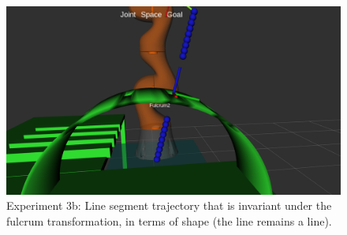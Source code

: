 \begin{center}
\begin{figure}[!htb]
\centering
\includegraphics[width=\textwidth]{images/robot_planner3/3b_line_seg_invariant.png}
\caption{Experiment 3b: Line segment trajectory that is invariant under the fulcrum transformation, in terms of shape (the line remains a line).}
\label{robot-planner3b-line-seg}
\end{figure}
\end{center}

